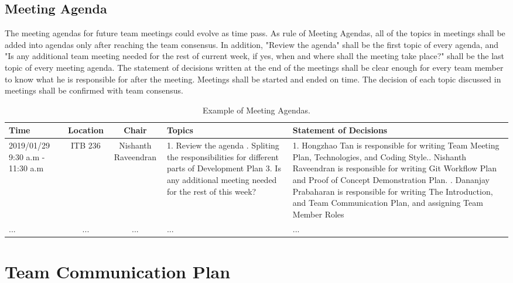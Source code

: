 \documentclass{article}
\begin{document}
\subsection{Meeting Agenda}
The meeting agendas for future team meetings could evolve as time pass. As rule of Meeting Agendas, all of the topics in meetings shall be added into agendas only after reaching the team consensus. In addition, "Review the agenda" shall be the first topic of every agenda, and "Is any additional team meeting needed for the rest of current week, if yes, when and where shall the meeting take place?" shall be the last topic of every meeting agenda. The statement of decisions written at the end of the meetings shall be clear enough for every team member to know what he is responsible for after the meeting. Meetings shall be started and ended on time. The decision of each topic discussed in meetings shall be confirmed with team consensus.
 \begin{table}[h!]
  \begin{center}
    \caption{Example of Meeting Agendas.}
    \label{tab:table1}
    \begin{tabular}{|p{2cm}|c|c|p{3cm}|p{3cm}|}
      \hline
      \textbf{Time} & \textbf{Location} & \textbf{Chair} & \textbf{Topics} & \textbf{Statement of Decisions}\\
      \hline
      2019/01/29 9:30 a.m - 11:30 a.m & ITB 236 & Nishanth Raveendran & 1. Review the agenda \newline 2. Spliting the responsibilities for different parts of Development Plan 3. Is any additional meeting needed for the rest of this week? & 1. Hongzhao Tan is responsible for writing Team Meeting Plan, Technologies, and Coding Style.\newline 2. Nishanth Raveendran is responsible for writing Git Workflow Plan and Proof of Concept Demonstration Plan. \newline 3. Dananjay Prabaharan is responsible for writing The Introduction, and Team Communication Plan, and assigning Team Member Roles\\ \hline
      ... & ... & ... & ... & ...\\ \hline
    \end{tabular}
  \end{center}
 \end{table}


\section{Team Communication Plan}
\end{document}
